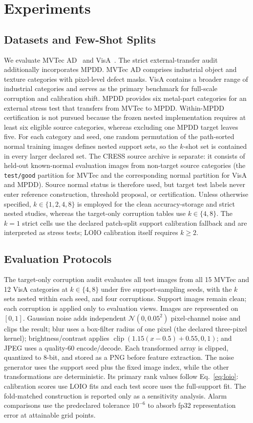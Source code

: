\section{Experiments}\label{sec:experiments}
\subsection{Datasets and Few-Shot Splits}
We evaluate MVTec AD~\cite{mvtec2019} and VisA~\cite{visa2022}. The strict external-transfer audit additionally incorporates MPDD\@. MVTec AD comprises industrial object and texture categories with pixel-level defect masks. VisA contains a broader range of industrial categories and serves as the primary benchmark for full-scale corruption and calibration shift. MPDD provides six metal-part categories for an external stress test that transfers from MVTec to MPDD. Within-MPDD certification is not pursued because the frozen nested implementation requires at least six eligible source categories, whereas excluding one MPDD target leaves five. For each category and seed, one random permutation of the path-sorted normal training images defines nested support sets, so the $k$-shot set is contained in every larger declared set. The CRESS source archive is separate: it consists of held-out known-normal evaluation images from non-target source categories (the \texttt{test/good} partition for MVTec and the corresponding normal partition for VisA and MPDD). Source normal status is therefore used, but target test labels never enter reference construction, threshold proposal, or certification. Unless otherwise specified, $k\in\{1,2,4,8\}$ is employed for the clean accuracy-storage and strict nested studies, whereas the target-only corruption tables use $k\in\{4,8\}$. The $k=1$ strict cells use the declared patch-split support calibration fallback and are interpreted as stress tests; LOIO calibration itself requires $k\geq2$.

\subsection{Evaluation Protocols}
The target-only corruption audit evaluates all test images from all 15 MVTec and 12 VisA categories at $k\in\{4,8\}$ under five support-sampling seeds, with the $k$ sets nested within each seed, and four corruptions. Support images remain clean; each corruption is applied only to evaluation views. Images are represented on $[0,1]$. Gaussian noise adds independent $\mathcal N(0,0.05^2)$ pixel-channel noise and clips the result; blur uses a box-filter radius of one pixel (the declared three-pixel kernel); brightness/contrast applies $\operatorname{clip}(1.15(x-0.5)+0.55,0,1)$; and JPEG uses a quality-60 encode/decode. Each transformed array is clipped, quantized to 8-bit, and stored as a PNG before feature extraction. The noise generator uses the support seed plus the fixed image index, while the other transformations are deterministic. Its primary rank values follow Eq.~\eqref{eq:loio}: calibration scores use LOIO fits and each test score uses the full-support fit. The fold-matched construction is reported only as a sensitivity analysis. Alarm comparisons use the predeclared tolerance $10^{-6}$ to absorb fp32 representation error at attainable grid points.

